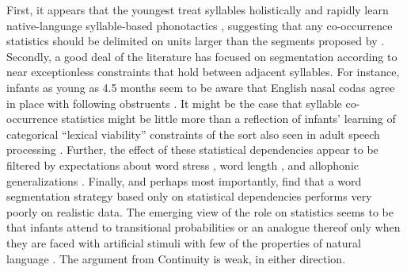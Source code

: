 First, it appears that the youngest treat syllables holistically \citep{Bertoncini1981,Jusczyk1987} and rapidly learn native-language syllable-based phonotactics \citep{Onishi2002,Chambers2003}, suggesting that any co-occurrence statistics should be delimited on units larger than the segments proposed by \citeauthor{Saffran1996}. Secondly, a good deal of the literature has focused on segmentation according to near exceptionless constraints that hold between adjacent syllables. For instance, infants as young as 4.5 months seem to be aware that English nasal codas agree in place with following obstruents \citep{Mattys2001b,Jusczyk2002,Davidson2004}. It might be the case that syllable co-occurrence statistics might be little more than a reflection of infants' learning of categorical ``lexical viability'' constraints \citep{Johnson2003} of the sort also seen in adult speech processing \citep[e.g.,][]{Norris1997}. Further, the effect of these statistical dependencies appear to be filtered by expectations about word stress \citep{Johnson2001,Mattys2001a,Shukla2007}, word length \citep{Lew-Williams2012}, and allophonic generalizations \citep{Hohne1994,Jusczyk1999c}. Finally, and perhaps most importantly, \citet{Gambell2005} find that a word segmentation strategy based only on statistical dependencies performs very poorly on realistic data. The emerging view of the role on statistics seems to be that infants attend to transitional probabilities or an analogue thereof only when they are faced with artificial stimuli with few of the properties of natural language \citep[e.g.,][]{Shukla2007,Lew-Williams2011}. The argument from Continuity is weak, in either direction.
